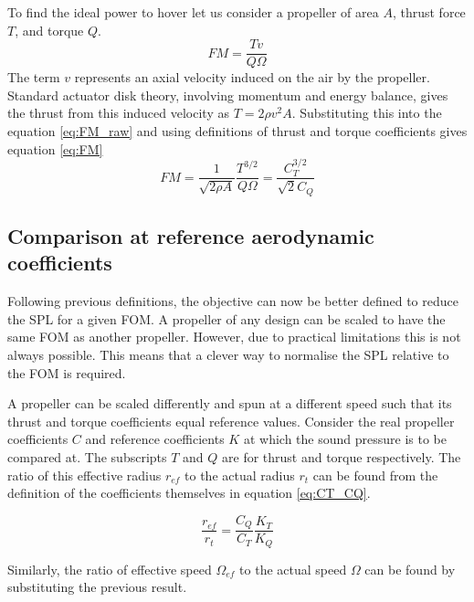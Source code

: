 \documentclass[12pt,a4paper]{article}
\begin{document}
To find the ideal power to hover let us consider a propeller of area $A$, thrust force $T$, and torque $Q$.
\begin{equation}
    FM = \frac{Tv}{Q \Omega} \label{eq:FM_raw}
\end{equation}
The term $v$ represents an axial velocity induced on the air by the propeller.
Standard actuator disk theory, involving momentum and energy balance, gives the thrust from this induced velocity as $ T = 2 \rho v^2 A$.
Substituting this into the equation \ref{eq:FM_raw} and using definitions of thrust and torque coefficients gives equation \ref{eq:FM}
\begin{equation}
    FM = \frac{1}{ \sqrt{2 \rho A}} \frac{T^{3/2}}{Q \Omega} = \frac{C_T^{3/2}}{\sqrt{2}C_Q} \label{eq:FM}
\end{equation}


\subsection{Comparison at reference aerodynamic coefficients}
Following previous definitions, the objective can now be better defined to reduce the SPL for a given FOM.
A propeller of any design can be scaled to have the same FOM as another propeller.
However, due to practical limitations this is not always possible. 
This means that a clever way to normalise the SPL relative to the FOM is required.

A propeller can be scaled differently and spun at a different speed such that its thrust and torque coefficients equal reference values.
Consider the real propeller coefficients $C$ and reference coefficients $K$ at which the sound pressure is to be compared at.
The subscripts $T$ and $Q$ are for thrust and torque respectively.
The ratio of this effective radius $r_{ef}$ to the actual radius $r_t$ can be found from the definition of the coefficients themselves in equation \ref{eq:CT_CQ}.

\begin{equation}
    \frac{r_{ef}}{r_t} = \frac{C_Q}{C_T}\frac{K_T}{K_Q}
\end{equation}

Similarly, the ratio of effective speed $\Omega_{ef}$ to the actual speed $\Omega$ can be found by substituting the previous result.
\end{document}

